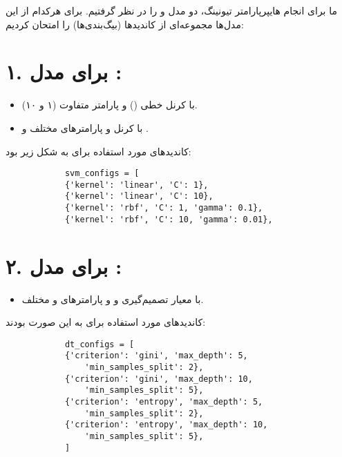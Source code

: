 \documentclass[a4paper,12pt]{article}
\begin{document}
	ما برای انجام هایپرپارامتر تیونینگ، دو مدل  و  را در نظر 
	گرفتیم. برای هرکدام از این مدل‌ها مجموعه‌ای از کاندیدها (بیگ‌بندی‌ها) را امتحان 
	کردیم:
	
	\section*{۱. برای مدل :}
	
	\begin{itemize}[label=\textbullet]
		\item با کرنل خطی () و پارامتر  متفاوت (۱ و ۱۰).
	\end{itemize}
	
	\begin{itemize}[label=\textbullet]
		\item با کرنل  و پارامترهای مختلف  و .
	\end{itemize}
	
	کاندیدهای مورد استفاده برای  به شکل زیر بود:
	
	\begin{latin}
		\begin{verbatim}
			svm_configs = [
			{'kernel': 'linear', 'C': 1},
			{'kernel': 'linear', 'C': 10},
			{'kernel': 'rbf', 'C': 1, 'gamma': 0.1},
			{'kernel': 'rbf', 'C': 10, 'gamma': 0.01},
		\end{verbatim}
	\end{latin}
	
	\section*{۲. برای مدل :}
	
	\begin{itemize}[label=\textbullet]
		\item با معیار تصمیم‌گیری  و  و پارامترهای  و  مختلف.
	\end{itemize}
	
	کاندیدهای مورد استفاده برای  به این صورت بودند:
	
	
	\begin{latin}
		\begin{verbatim}
			dt_configs = [
			{'criterion': 'gini', 'max_depth': 5,
				'min_samples_split': 2},
			{'criterion': 'gini', 'max_depth': 10,
				'min_samples_split': 5},
			{'criterion': 'entropy', 'max_depth': 5,
				'min_samples_split': 2},
			{'criterion': 'entropy', 'max_depth': 10,
				'min_samples_split': 5},
			]
		\end{verbatim}
	\end{latin}
	
\end{document}
